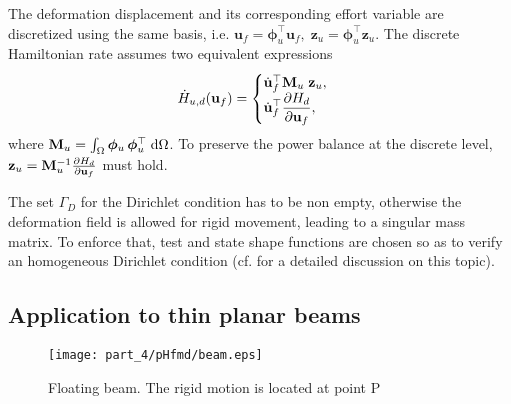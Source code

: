 The deformation displacement and its corresponding effort variable are discretized using the same basis, i.e. $\bm{u}_f = \bm{\phi}_u^\top \mathbf{u}_f, \; \bm{z}_u = \bm{\phi}_u^\top \mathbf{z}_u$. The discrete Hamiltonian rate assumes two equivalent expressions
\begin{equation*}
\dot{H}_{u, d}(\mathbf{u}_f) = 
\begin{cases}
\dot{\mathbf{u}}_f^\top \mathbf{M}_u \; \mathbf{z}_u, \\
\displaystyle \dot{\mathbf{u}}_f^\top \diffp{H_d}{\mathbf{u}_f},
\end{cases}
\end{equation*}
where $\mathbf{M}_u=\int_{\Omega} \bm{\phi}_u \, \bm{\phi}_u^\top \d{\Omega}$. To preserve the power balance at the discrete level, $ \mathbf{z}_u = \mathbf{M}_u^{-1} \diffp{H_d}{\mathbf{u}_f}$ must hold. \\

\begin{remark}\label{rmk:MB_dirich}
	The set $\Gamma_D$ for the Dirichlet condition has to be non empty, otherwise the deformation field is allowed for rigid movement, leading to a singular mass matrix. To enforce that, test and state shape functions are chosen so as to verify an homogeneous Dirichlet condition (cf. \cite{agrawal1986application} for a detailed discussion on this topic).  
\end{remark}

\subsection{Application to thin planar beams}
\label{sec:ph_floatbeam}

\begin{figure}[t]
	\centering
	\texttt{[image: part\_4/pHfmd/beam.eps]} 
	\caption{Floating beam. The rigid motion is located at point P}
	\label{fig:beam}
\end{figure}


